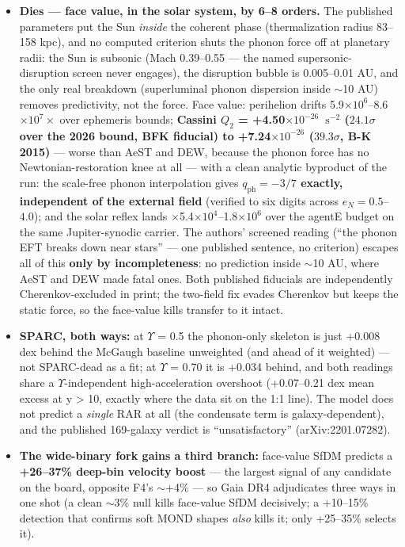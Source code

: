\documentclass[11pt,a4paper]{article}
\begin{document}
\begin{itemize}
\item \textbf{Dies --- face value, in the solar system, by 6--8 orders.} The published parameters put the Sun \emph{inside} the coherent phase (thermalization radius 83--158 kpc), and no computed criterion shuts the phonon force off at planetary radii: the Sun is subsonic (Mach 0.39--0.55 --- the named supersonic-disruption screen never engages), the disruption bubble is 0.005--0.01 AU, and the only real breakdown (superluminal phonon dispersion inside $\sim$10 AU) removes predictivity, not the force. Face value: perihelion drifts 5.9$\times10^{6}$--8.6$\times10^{7}{}\times$ over ephemeris bounds; \textbf{Cassini $Q_2$ = +4.50$\times10^{-26}$\ $\mathrm{s^{-2}}$ ($24.1\sigma$ over the 2026 bound, BFK fiducial) to +7.24$\times10^{-26}$ ($39.3\sigma$, B-K 2015)} --- worse than AeST and DEW, because the phonon force has no Newtonian-restoration knee at all --- with a clean analytic byproduct of the run: the scale-free phonon interpolation gives \textbf{$q_{\mathrm{ph}} = -3/7$ exactly, independent of the external field} (verified to six digits across $e_N = 0.5$--$4.0$); and the solar reflex lands $\times$5.4$\times10^{4}$--1.8$\times10^{6}$ over the agentE budget on the same Jupiter-synodic carrier. The authors' screened reading (``the phonon EFT breaks down near stars'' --- one published sentence, no criterion) escapes all of this \textbf{only by incompleteness}: no prediction inside $\sim$10 AU, where AeST and DEW made fatal ones. Both published fiducials are independently Cherenkov-excluded in print; the two-field fix evades Cherenkov but keeps the static force, so the face-value kills transfer to it intact.

\item \textbf{SPARC, both ways:} at $\Upsilon$ = 0.5 the phonon-only skeleton is just +0.008 dex behind the McGaugh baseline unweighted (and ahead of it weighted) --- not SPARC-dead as a fit; at $\Upsilon$ = 0.70 it is +0.034 behind, and both readings share a $\Upsilon$-independent high-acceleration overshoot (+0.07--0.21 dex mean excess at y > 10, exactly where the data sit on the 1:1 line). The model does not predict a \emph{single} RAR at all (the condensate term is galaxy-dependent), and the published 169-galaxy verdict is ``unsatisfactory'' (arXiv:2201.07282).

\item \textbf{The wide-binary fork gains a third branch:} face-value SfDM predicts a \textbf{+26--37\% deep-bin velocity boost} --- the largest signal of any candidate on the board, opposite F4's $\sim$+4\% --- so Gaia DR4 adjudicates three ways in one shot (a clean $\sim$3\% null kills face-value SfDM decisively; a +10--15\% detection that confirms soft MOND shapes \emph{also} kills it; only +25--35\% selects it).


\end{itemize}
\end{document}
